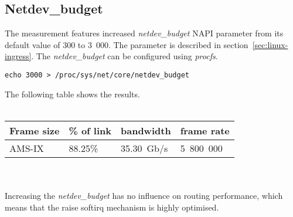
\subsection{Netdev\_budget}
The measurement features increased {\it{netdev\_budget}} NAPI parameter from its default value of 300 to 3~000.
The parameter is described in section~\ref{sec:linux-ingress}.
The {\it{netdev\_budget}} can be configured using {\it{procfs}}.
\begin{lstlisting}
echo 3000 > /proc/sys/net/core/netdev_budget
\end{lstlisting}
The following table shows the results.
\\
\\
\begin{tabular}{ | l | l | l | l | }
\hline
Frame size & \% of link & bandwidth & frame rate \\
\hline
AMS-IX & 88.25\% & 35.30~Gb/s & 5~800~000 \\
\hline
\end{tabular}
\\
\\
Increasing the {\it{netdev\_budget}} has no influence on routing performance,
which means that the raise softirq mechanism is highly optimised.
